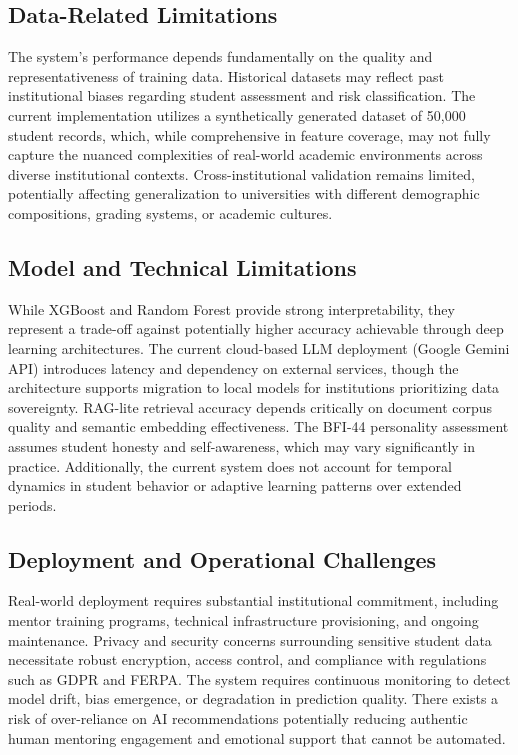\documentclass[conference]{IEEEtran}
\begin{document}
\subsection{Data-Related Limitations}
The system's performance depends fundamentally on the quality and representativeness of training data. Historical datasets may reflect past institutional biases regarding student assessment and risk classification. The current implementation utilizes a synthetically generated dataset of 50,000 student records, which, while comprehensive in feature coverage, may not fully capture the nuanced complexities of real-world academic environments across diverse institutional contexts. Cross-institutional validation remains limited, potentially affecting generalization to universities with different demographic compositions, grading systems, or academic cultures.

\subsection{Model and Technical Limitations}
While XGBoost and Random Forest provide strong interpretability, they represent a trade-off against potentially higher accuracy achievable through deep learning architectures. The current cloud-based LLM deployment (Google Gemini API) introduces latency and dependency on external services, though the architecture supports migration to local models for institutions prioritizing data sovereignty. RAG-lite retrieval accuracy depends critically on document corpus quality and semantic embedding effectiveness. The BFI-44 personality assessment assumes student honesty and self-awareness, which may vary significantly in practice. Additionally, the current system does not account for temporal dynamics in student behavior or adaptive learning patterns over extended periods.

\subsection{Deployment and Operational Challenges}
Real-world deployment requires substantial institutional commitment, including mentor training programs, technical infrastructure provisioning, and ongoing maintenance. Privacy and security concerns surrounding sensitive student data necessitate robust encryption, access control, and compliance with regulations such as GDPR and FERPA. The system requires continuous monitoring to detect model drift, bias emergence, or degradation in prediction quality. There exists a risk of over-reliance on AI recommendations potentially reducing authentic human mentoring engagement and emotional support that cannot be automated.
\end{document}
